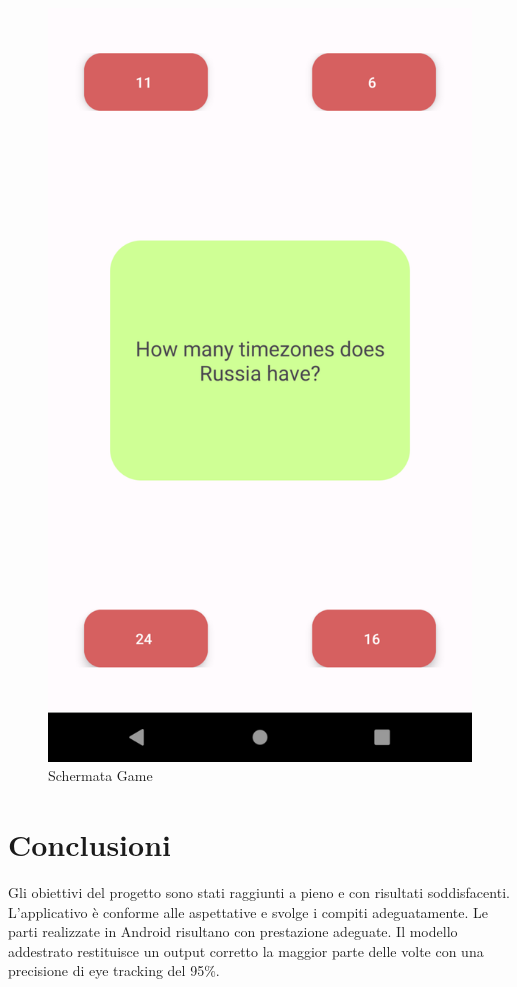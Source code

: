 \documentclass[11pt]{article}
\begin{document}
\begin{figure}[h]
	\centering
	\caption{Schermata Game}
	\includegraphics[scale=0.2]{img/game.png}
\end{figure}







\newpage
\section{Conclusioni}
Gli obiettivi del progetto sono stati raggiunti a pieno e con risultati soddisfacenti. 
\newline \newline
L’applicativo è
conforme alle aspettative e svolge i compiti adeguatamente.
Le parti realizzate
in Android risultano con prestazione adeguate.
\newline \newline
Il modello addestrato restituisce un output corretto la maggior parte delle volte con una precisione di eye tracking del 95\%.
\end{document}
